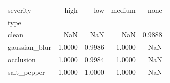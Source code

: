 \begin{tabular}{lrrrr}
\toprule
severity & high & low & medium & none \\
type &  &  &  &  \\
\midrule
clean & NaN & NaN & NaN & 0.9888 \\
gaussian_blur & 1.0000 & 0.9986 & 1.0000 & NaN \\
occlusion & 1.0000 & 0.9984 & 1.0000 & NaN \\
salt_pepper & 1.0000 & 1.0000 & 1.0000 & NaN \\
\bottomrule
\end{tabular}

